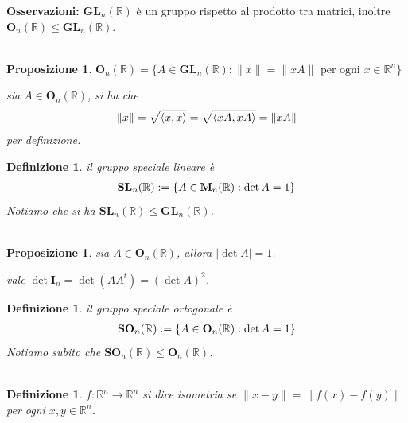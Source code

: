 \documentclass[oneside, 11pt]{amsbook}
\makeatletter
\newcommand{\0}{{(0)}}
\newcommand{\3}{{(3)}}
\theoremstyle{colonplain}
\newtheorem{prop}[thm]{Proposizione}
\theoremstyle{colondefinition}
\newtheorem{defn}[thm]{Definizione}
\theoremstyle{colonremark}
\numberwithin{equation}{chapter}
\renewcommand{\proofname}{Dimostrazione}
\renewenvironment{proof}[1][\proofname]{\par
  \pushQED{\qed}%
  \normalfont \topsep6\p@\@plus6\p@\relax
  \trivlist
  \item[\hskip\labelsep\bfseries #1:]\ignorespaces
}{%
  \popQED\endtrivlist\@endpefalse
}
\makeatother
\begin{document}
\textbf{Osservazioni:} $\mathbf{GL}_n(\mathbb{R})$ è un gruppo rispetto al prodotto tra matrici, inoltre $\mathbf{O}_n(\mathbb{R}) \leq \mathbf{GL}_n(\mathbb{R})$. \\ \\
\begin{prop} $\mathbf{O}_n(\mathbb{R}) = \{ A \in \mathbf{GL}_n(\mathbb{R}) : \| x \| = \| xA \| \text{ per ogni } x \in \mathbb{R}^n \}$ \\

\begin{proof} sia $A \in \mathbf{O}_n(\mathbb{R})$, si ha che
\begin{align}
    \| x \| = \sqrt{\langle x, x \rangle} = \sqrt{\langle xA, xA \rangle} = \| xA \| \notag
\end{align}
per definizione. \end{proof}
\end{prop}
\begin{defn} il \textit{gruppo speciale lineare} è
\begin{align}
    \mathbf{SL}_n(\mathbb{R}) := \{ A \in \mathbf{M}_n(\mathbb{R}) : \det A = 1 \} \notag
\end{align}
Notiamo che si ha $\mathbf{SL}_n(\mathbb{R}) \leq \mathbf{GL}_n(\mathbb{R})$. \\ \\
\end{defn}
\begin{prop} sia $A \in \mathbf{O}_n(\mathbb{R})$, allora $|\det A| = 1$. \\

\begin{proof} vale $\det \mathbf{I}_n = \det (AA^t) = (\det A)^2$. \end{proof}
\end{prop}
\begin{defn} il \textit{gruppo speciale ortogonale} è
\begin{align}
    \mathbf{SO}_n(\mathbb{R}) := \{ A \in \mathbf{O}_n(\mathbb{R}) : \det A = 1 \} \notag
\end{align}
Notiamo subito che $\mathbf{SO}_n(\mathbb{R}) \leq \mathbf{O}_n(\mathbb{R})$. \\ \\
\end{defn}
\begin{defn} $f : \mathbb{R}^n \longrightarrow \mathbb{R}^n$ si dice \textit{isometria} se $\| x - y \| = \| f(x) - f(y) \|$ per ogni $x, y \in \mathbb{R}^n$. \\ \\
\end{defn}
\end{document}
